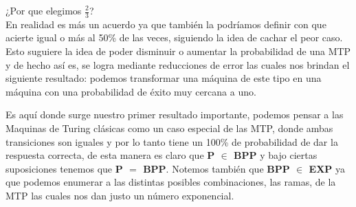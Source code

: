 \documentclass[12pt,letterpaper]{article}
\begin{document}
¿Por que elegimos $\frac{2}{3}$?\\
En realidad es más un acuerdo ya que también la podríamos definir con que acierte igual o más al 50\% de las veces, siguiendo la idea de cachar el peor caso. Esto suguiere la idea de poder disminuir o aumentar la probabilidad de una MTP y de hecho así es, se logra mediante reducciones de error las cuales nos brindan el siguiente resultado: podemos transformar una máquina de este tipo en una máquina con una probabilidad de éxito muy cercana a uno.

Es aquí donde surge nuestro primer resultado importante, podemos pensar a las Maquinas de Turing clásicas como un caso especial de las MTP, donde ambas transiciones son iguales y por lo tanto tiene un 100\% de probabilidad de dar la respuesta correcta, de esta manera es claro que \textbf{P $\in$ BPP} y bajo ciertas suposiciones tenemos que \textbf{P $=$ BPP}. Notemos también que \textbf{BPP $\in$ EXP} ya que podemos enumerar a las distintas posibles combinaciones, las ramas, de la MTP las cuales nos dan justo un número exponencial.












\end{document}
